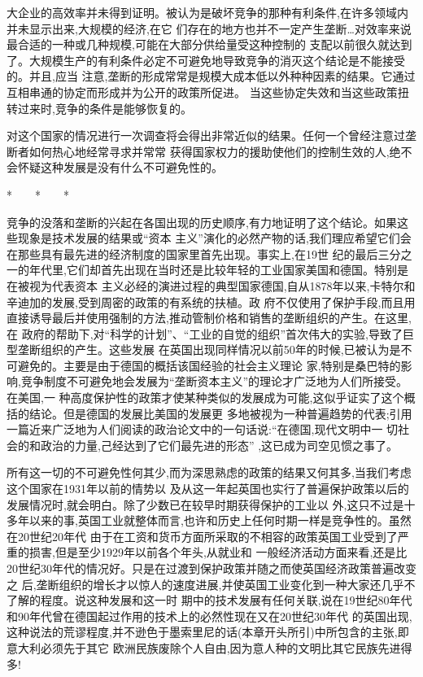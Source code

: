 ﻿\documentclass[12pt]{article}
\begin{document}
大企业的高效率并未得到证明。被认为是破坏竞争的那种有利条件,在许多领域内并未显示出来,大规模的经济,在它
们存在的地方也并不一定产生垄断\ldots 对效率来说最合适的一种或几种规模,可能在大部分供给量受这种控制的
支配以前很久就达到了。大规模生产的有利条件必定不可避免地导致竞争的消灭这个结论是不能接受的。并且,应当
注意,垄断的形成常常是规模大成本低以外种种因素的结果。它通过互相串通的协定而形成并为公开的政策所促进。
当这些协定失效和当这些政策扭转过来时,竞争的条件是能够恢复的。

对这个国家的情况进行一次调查将会得出非常近似的结果。任何一个曾经注意过垄断者如何热心地经常寻求并常常
获得国家权力的援助使他们的控制生效的人,绝不会怀疑这种发展是没有什么不可避免性的。

*　　*　　*

竞争的没落和垄断的兴起在各国出现的历史顺序,有力地证明了这个结论。如果这些现象是技术发展的结果或``资本
主义''演化的必然产物的话,我们理应希望它们会在那些具有最先进的经济制度的国家里首先出现。事实上,在19世
纪的最后三分之一的年代里,它们却首先出现在当时还是比较年轻的工业国家美国和德国。特别是在被视为代表资本
主义必经的演进过程的典型国家德国,自从1878年以来,卡特尔和辛迪加的发展,受到周密的政策的有系统的扶植。政
府不仅使用了保护手段,而且用直接诱导最后并使用强制的方法,推动管制价格和销售的垄断组织的产生。在这里,在
政府的帮助下,对``科学的计划''、``工业的自觉的组织''首次伟大的实验,导致了巨型垄断组织的产生。这些发展
在英国出现同样情况以前50年的时候,已被认为是不可避免的。主要是由于德国的概括该国经验的社会主义理论
家,特别是桑巴特的影响,竞争制度不可避免地会发展为``垄断资本主义''的理论才广泛地为人们所接受。在美国,一
种高度保护性的政策才使某种类似的发展成为可能,这似乎证实了这个概括的结论。但是德国的发展比美国的发展更
多地被视为一种普遍趋势的代表;引用一篇近来广泛地为人们阅读的政治论文中的一句话说:``在德国,现代文明中一
切社会的和政治的力量,己经达到了它们最先进的形态'' ,这已成为司空见惯之事了。

所有这一切的不可避免性何其少,而为深思熟虑的政策的结果又何其多,当我们考虑这个国家在1931年以前的情势以
及从这一年起英国也实行了普遍保护政策以后的发展情况时,就会明白。除了少数已在较早时期获得保护的工业以
外,这只不过是十多年以来的事,英国工业就整体而言,也许和历史上任何时期一样是竞争性的。虽然在20世纪20年代
由于在工资和货币方面所采取的不相容的政策英国工业受到了严重的损害,但是至少1929年以前各个年头,从就业和
一般经济活动方面来看,还是比20世纪30年代的情况好。只是在过渡到保护政策并随之而使英国经济政策普遍改变之
后,垄断组织的增长才以惊人的速度进展,并使英国工业变化到一种大家还几乎不了解的程度。说这种发展和这一时
期中的技术发展有任何关联,说在19世纪80年代和90年代曾在德国起过作用的技术上的必然性现在又在20世纪30年代
的英国出现,这种说法的荒谬程度,并不逊色于墨索里尼的话(本章开头所引)中所包含的主张,即意大利必须先于其它
欧洲民族废除个人自由,因为意人种的文明比其它民族先进得多!
\end{document}
